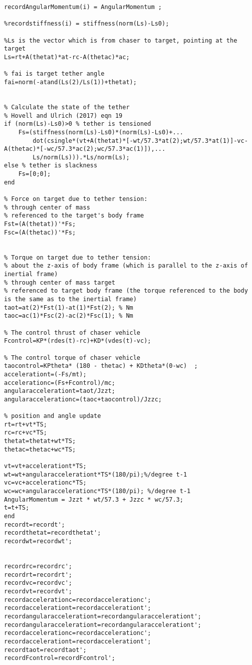 \begin{lstlisting}
recordAngularMomentum(i) = AngularMomentum ; 

%recordstiffness(i) = stiffness(norm(Ls)-Ls0);

%Ls is the vector which is from chaser to target, pointing at the target
Ls=rt+A(thetat)*at-rc-A(thetac)*ac;

% fai is target tether angle
fai=norm(-atand(Ls(2)/Ls(1))+thetat);


% Calculate the state of the tether 
% Hovell and Ulrich (2017) eqn 19
if (norm(Ls)-Ls0)>0 % tether is tensioned
    Fs=(stiffness(norm(Ls)-Ls0)*(norm(Ls)-Ls0)+...
        dot(csingle*(vt+A(thetat)*[-wt/57.3*at(2);wt/57.3*at(1)]-vc-A(thetac)*[-wc/57.3*ac(2);wc/57.3*ac(1)]),...
        Ls/norm(Ls))).*Ls/norm(Ls);
else % tether is slackness
    Fs=[0;0];
end

% Force on target due to tether tension:
% through center of mass
% referenced to the target's body frame
Fst=(A(thetat))'*Fs;
Fsc=(A(thetac))'*Fs;


% Torque on target due to tether tension:
% about the z-axis of body frame (which is parallel to the z-axis of inertial frame)
% through center of mass target
% referenced to target body frame (the torque referenced to the body is the same as to the inertial frame)
taot=at(2)*Fst(1)-at(1)*Fst(2); % Nm
taoc=ac(1)*Fsc(2)-ac(2)*Fsc(1); % Nm

% The control thrust of chaser vehicle
Fcontrol=KP*(rdes(t)-rc)+KD*(vdes(t)-vc);

% The control torque of chaser vehicle
taocontrol=KPtheta* (180 - thetac) + KDtheta*(0-wc)  ;
accelerationt=(-Fs/mt);
accelerationc=(Fs+Fcontrol)/mc;
angularaccelerationt=taot/Jzzt;
angularaccelerationc=(taoc+taocontrol)/Jzzc;

% position and angle update
rt=rt+vt*TS;
rc=rc+vc*TS;
thetat=thetat+wt*TS;
thetac=thetac+wc*TS;

vt=vt+accelerationt*TS;
wt=wt+angularaccelerationt*TS*(180/pi);%/degree t-1
vc=vc+accelerationc*TS;
wc=wc+angularaccelerationc*TS*(180/pi); %/degree t-1
AngularMomentum = Jzzt * wt/57.3 + Jzzc * wc/57.3;
t=t+TS;
end
recordt=recordt';
recordthetat=recordthetat';
recordwt=recordwt';


recordrc=recordrc';
recordrt=recordrt';
recordvc=recordvc';
recordvt=recordvt';
recordaccelerationc=recordaccelerationc';
recordaccelerationt=recordaccelerationt';
recordangularaccelerationt=recordangularaccelerationt';
recordangularaccelerationt=recordangularaccelerationt';
recordaccelerationc=recordaccelerationc';
recordaccelerationt=recordaccelerationt';
recordtaot=recordtaot';
recordFcontrol=recordFcontrol';


\end{lstlisting}
